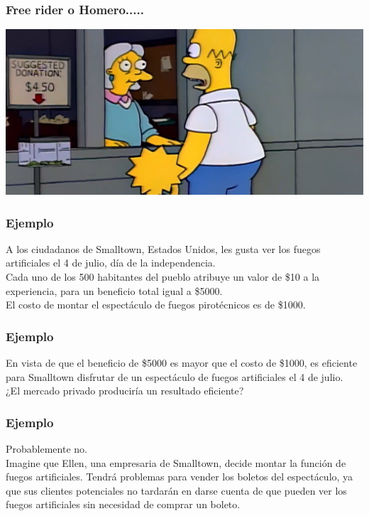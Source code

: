 \documentclass{beamer}
\begin{document}
\begin{frame}
\frametitle{Free rider o Homero.....}
    \centering  
    \href{https://econ.video/2017/10/26/the-simpsons-pay-what-you-want/}{\includegraphics[scale=0.35]{Slides Principios de Economia/Figures/BienespublicosHomero.png}}  
\end{frame}


\begin{frame}
\frametitle{Ejemplo}
A los ciudadanos de Smalltown, Estados Unidos, les gusta ver los fuegos artificiales el 4 de julio, día de la independencia. \\
\vspace{3mm}
Cada uno de los 500 habitantes del pueblo atribuye un valor de \$10 a la experiencia, para un beneficio total igual a \$5000.\\
\vspace{3mm} 
El costo de montar el espectáculo de fuegos pirotécnicos es de \$1000. 
\end{frame}

\begin{frame}
\frametitle{Ejemplo}
En vista de que el beneficio de \$5000 es mayor que el costo de \$1000, es eficiente para Smalltown disfrutar de un espectáculo de fuegos artificiales el 4 de julio.\\
\vspace{3mm} 
¿El mercado privado produciría un resultado eficiente? 
\end{frame}

\begin{frame}
\frametitle{Ejemplo}
Probablemente no. \\
\vspace{3mm} 
Imagine que Ellen, una empresaria de Smalltown, decide montar la función de fuegos artificiales. Tendrá problemas para vender los boletos del espectáculo, ya que sus clientes potenciales no tardarán en darse cuenta de que pueden ver los fuegos artificiales sin necesidad de comprar un boleto.
\end{frame}
\end{document}
